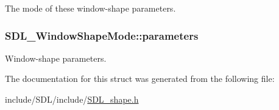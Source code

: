 The mode of these window-\/shape parameters. 

\hypertarget{struct_s_d_l___window_shape_mode_a2f79bb294034156207fa6d88d3a8c819}{
\subsubsection[{parameters}]{ S\-D\-L\-\_\-\-Window\-Shape\-Mode\-::parameters}}\label{struct_s_d_l___window_shape_mode_a2f79bb294034156207fa6d88d3a8c819}


Window-\/shape parameters. 



The documentation for this struct was generated from the following file\-:\begin{DoxyCompactItemize}
\item 
include/\-S\-D\-L/include/\hyperlink{_s_d_l__shape_8h}{S\-D\-L\-\_\-shape.\-h}\end{DoxyCompactItemize}
